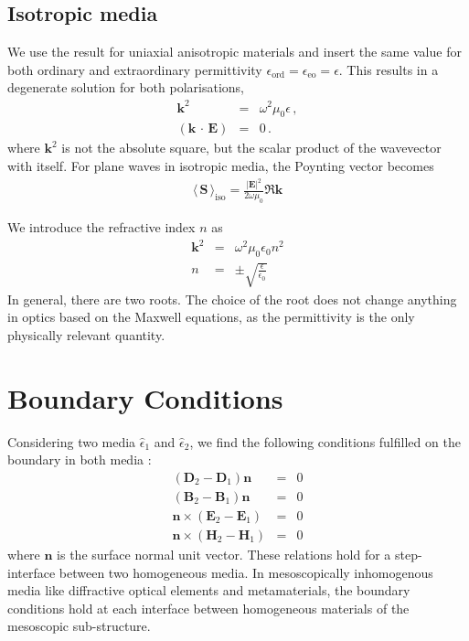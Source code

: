 \documentclass[12pt,a4paper,twoside,openright,BCOR10mm,headsepline,titlepage,abstracton,chapterprefix,final]{scrreprt}
\newcommand\Vector[1]{{\mathbf{#1}}}
\newcommand\vacuum{0}
\newcommand\wavenumber{k}
\newcommand\Wavevector{\Vector{\wavenumber}}
\newcommand\Tensor[1]{\hat{#1}}
\newcommand{\scpm}[2]{(#1\,\cdot\,#2)}
\newcommand\scalarEfield{E}
\newcommand\scalarBfield{B}
\newcommand\scalarHfield{H}
\newcommand\scalarDfield{D}
\newcommand\Efield{\Vector{\scalarEfield}}
\newcommand\Bfield{\Vector{\scalarBfield}}
\newcommand\Hfield{\Vector{\scalarHfield}}
\newcommand\Dfield{\Vector{\scalarDfield}}
\newcommand\vacuumpermeability{\mu_{\vacuum}}
\newcommand\permittivity{\Tensor{\epsilon}}
\newcommand\vacuumpermittivity{\epsilon_{\vacuum}}
\newcommand\scalarpermittivity{\epsilon}
\newcommand\ordi{\text{ord}}
\newcommand\eo{\text{eo}}
\newcommand{\timeavg}[1]{{\langle\,#1\,\rangle}}
\newcommand{\chk}[1]{\color{green}{$\checkmark$#1}}
\begin{document}
\subsection{Isotropic media\chk{JH}}

We use the result for uniaxial anisotropic materials and insert the same value for both ordinary and extraordinary permittivity $\scalarpermittivity_{\ordi} = \scalarpermittivity_{\eo} = \scalarpermittivity$.
This results in a degenerate solution for both polarisations,
\begin{eqnarray}
 \Wavevector^2 &=& \omega^2 \vacuumpermeability \scalarpermittivity\,, \\
 \scpm{\Wavevector}{\Efield} &=& 0\,.
\end{eqnarray}
where $\Wavevector^2$ is not the absolute square, but the scalar product of the wavevector with itself.
For plane waves in isotropic media, the Poynting vector becomes 
\begin{eqnarray}
 \timeavg{\Vector{S}}_\text{iso} = \frac{ |\Efield|^2 }{ 2\omega\vacuumpermeability } \Re \Wavevector
\end{eqnarray}

We introduce the refractive index $n$ as
\begin{eqnarray}
 \Wavevector^2 &=& \omega^2 \vacuumpermeability \vacuumpermittivity n^2 \\
 n &=& \pm \sqrt{ \frac{\scalarpermittivity}{\vacuumpermittivity} }
\end{eqnarray}
In general, there are two roots. 
The choice of the root does not change anything in optics based on the Maxwell equations, as the permittivity is the only physically relevant quantity.




\section{Boundary Conditions}
Considering two media $\permittivity_1$ and $\permittivity_2$, we find the following conditions fulfilled on the boundary in both media \cite{Jackson}:
\begin{subequations}
\begin{eqnarray}
 ( \Dfield_2 - \Dfield_1 ) \Vector{n} &=& 0 \\
 ( \Bfield_2 - \Bfield_1 ) \Vector{n} &=& 0 \\
 \Vector{n} \times ( \Efield_2 - \Efield_1 ) &=& 0 \\
 \Vector{n} \times ( \Hfield_2 - \Hfield_1 ) &=& 0 
\end{eqnarray}
\label{eq:boundary_conditions} 
\end{subequations}
where $\Vector{n}$ is the surface normal unit vector.
These relations hold for a step-interface between two homogeneous media. 
In mesoscopically inhomogenous media like  diffractive optical elements and metamaterials, 
the boundary conditions hold at each interface between homogeneous materials of the mesoscopic sub-structure.
\end{document}
